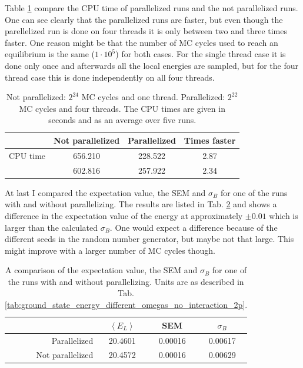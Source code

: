 Table \ref{tab:CPUtime_parallelization} compare the CPU time of parallelized runs and the not parallelized runs. One can see clearly that the parallelized runs are faster, but even though the parellelized run is done on four threads it is only between two and three times faster. One reason might be that the number of MC cycles used to reach an equilibrium is the same ($1\cdot 10^5$) for both cases. For the single thread case it is done only once and afterwards all the local energies are sampled, but for the four thread case this is done independently on all four threads.

\begin{table}[H]\caption{Not parallelized: $2^{24}$ MC cycles and one thread. Parallelized: $2^{22}$ MC cycles and four threads. The CPU times are given in seconds and as an average over five runs.}\label{tab:CPUtime_parallelization}
\center
\begin{tabular}{r|ccc}
& Not parallelized & Parallelized & Times faster \\ \hline
CPU time &  656.210  & 228.522 & 2.87\\
 & 602.816   & 257.922  & 2.34\\
\end{tabular}
\end{table}

At last I compared the expectation value, the SEM and $\sigma_B$ for one of the runs with and without parallelizing. The results are listed in Tab. \ref{tab:energy_parallelization} and shows a difference in the expectation value of the energy at approximately $\pm 0.01$ which is larger than the calculated $\sigma_B$. One would expect a difference because of the different seeds in the random number generator, but maybe not that large. This might improve with a larger number of MC cycles though. 

\begin{table}[H]\caption{A comparison of the expectation value, the SEM and $\sigma_B$ for one of the runs with and without parallelizing. Units are as described in Tab. \ref{tab:ground_state_energy_different_omegas_no_interaction_2p}.}\label{tab:energy_parallelization}
\center
\begin{tabular}{r|ccc}
& $\left< E_L \right>$ & SEM & $\sigma_B$ \\ \hline
Parallelized & 20.4601 & 0.00016 & 0.00617 \\
Not parallelized & 20.4572 & 0.00016 & 0.00629 \\
\end{tabular}
\end{table}

